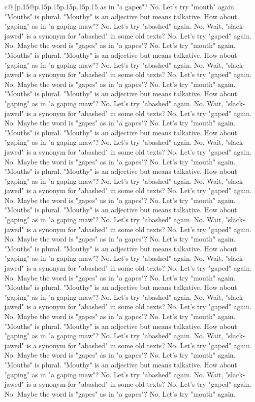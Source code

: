 \documentclass{article}
\begin{document}
{\begin{supertabular}{c@{$\;$}|p{.15\linewidth}@{}p{.15\linewidth}p{.15\linewidth}p{.15\linewidth}p{.15\linewidth}p{.15\linewidth}}
{{{as in "a gapes"? No. Let's try "mouth" again. "Mouths" is plural. "Mouthy" is an adjective but means talkative. How about "gaping" as in "a gaping maw"? No. Let's try "abashed" again. No. Wait, "slack{-}jawed" is a synonym for "abashed" in some old texts? No. Let's try "gaped" again. No. Maybe the word is "gapes" as in "a gapes"? No. Let's try "mouth" again. "Mouths" is plural. "Mouthy" is an adjective but means talkative. How about "gaping" as in "a gaping maw"? No. Let's try "abashed" again. No. Wait, "slack{-}jawed" is a synonym for "abashed" in some old texts? No. Let's try "gaped" again. No. Maybe the word is "gapes" as in "a gapes"? No. Let's try "mouth" again. "Mouths" is plural. "Mouthy" is an adjective but means talkative. How about "gaping" as in "a gaping maw"? No. Let's try "abashed" again. No. Wait, "slack{-}jawed" is a synonym for "abashed" in some old texts? No. Let's try "gaped" again. No. Maybe the word is "gapes" as in "a gapes"? No. Let's try "mouth" again. "Mouths" is plural. "Mouthy" is an adjective but means talkative. How about "gaping" as in "a gaping maw"? No. Let's try "abashed" again. No. Wait, "slack{-}jawed" is a synonym for "abashed" in some old texts? No. Let's try "gaped" again. No. Maybe the word is "gapes" as in "a gapes"? No. Let's try "mouth" again. "Mouths" is plural. "Mouthy" is an adjective but means talkative. How about "gaping" as in "a gaping maw"? No. Let's try "abashed" again. No. Wait, "slack{-}jawed" is a synonym for "abashed" in some old texts? No. Let's try "gaped" again. No. Maybe the word is "gapes" as in "a gapes"? No. Let's try "mouth" again. "Mouths" is plural. "Mouthy" is an adjective but means talkative. How about "gaping" as in "a gaping maw"? No. Let's try "abashed" again. No. Wait, "slack{-}jawed" is a synonym for "abashed" in some old texts? No. Let's try "gaped" again. No. Maybe the word is "gapes" as in "a gapes"? No. Let's try "mouth" again. "Mouths" is plural. "Mouthy" is an adjective but means talkative. How about "gaping" as in "a gaping maw"? No. Let's try "abashed" again. No. Wait, "slack{-}jawed" is a synonym for "abashed" in some old texts? No. Let's try "gaped" again. No. Maybe the word is "gapes" as in "a gapes"? No. Let's try "mouth" again. "Mouths" is plural. "Mouthy" is an adjective but means talkative. How about "gaping" as in "a gaping maw"? No. Let's try "abashed" again. No. Wait, "slack{-}jawed" is a synonym for "abashed" in some old texts? No. Let's try "gaped" again. No. Maybe the word is "gapes" as in "a gapes"? No. Let's try "mouth" again. "Mouths" is plural. "Mouthy" is an adjective but means talkative. How about "gaping" as in "a gaping maw"? No. Let's try "abashed" again. No. Wait, "slack{-}jawed" is a synonym for "abashed" in some old texts? No. Let's try "gaped" again. No. Maybe the word is "gapes" as in "a gapes"? No. Let's try "mouth" again. "Mouths" is plural. "Mouthy" is an adjective but means talkative. How about "gaping" as in "a gaping maw"? No. Let's try "abashed" again. No. Wait, "slack{-}jawed" is a synonym for "abashed" in some old texts? No. Let's try "gaped" again. No. Maybe the word is "gapes" as in "a gapes"? No. Let's try "mouth" again. }}}
\end{supertabular}}
\end{document}
